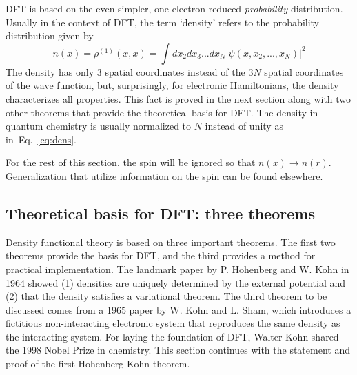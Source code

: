 \documentclass[11pt,oneside,final]{huthesis}%
\begin{document}
DFT is based on the even simpler, one-electron reduced \emph{probability} distribution.  Usually in the context of DFT, the term `density' refers to the probability distribution given by
\begin{equation}
n(x)=\rho^{(1)}(x,x)=\int dx_2 dx_3...dx_N |\psi(x,x_2,...,x_N)|^2
\label{eq:dens}
\end{equation}
The density has only 3 spatial coordinates instead of the $3N$ spatial coordinates of the wave function, but, surprisingly, for electronic Hamiltonians, the density characterizes all properties.    This fact is proved in the next section along with two other theorems that provide the theoretical basis for DFT.
The density in quantum chemistry is usually normalized to $N$ instead of unity as in~Eq.~\eqref{eq:dens}.  

For the rest of this section, the spin will be ignored so that $n(x)\to n(r)$.  Generalization that utilize information on the spin can be found elsewhere.

\subsection{Theoretical basis for DFT: three theorems}

Density functional theory is based on three important theorems. The first two theorems provide the basis for DFT, and the third provides a method for practical implementation.  The landmark paper by P. Hohenberg and W. Kohn in 1964 showed (1) densities are uniquely determined by the external potential and (2) that the density satisfies a variational theorem. The third theorem to be discussed comes from a 1965 paper by W. Kohn and L. Sham, which introduces a fictitious non-interacting electronic system that reproduces the same density as the interacting system.  For laying the foundation of DFT, Walter Kohn shared the 1998 Nobel Prize in chemistry.  This section continues with the statement and proof of the first Hohenberg-Kohn theorem.
\end{document}
